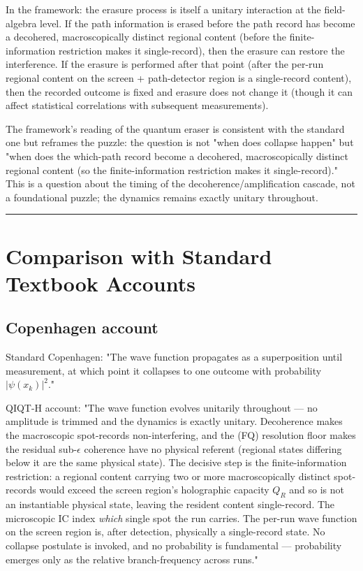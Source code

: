 \documentclass[11pt,a4paper]{article}
\begin{document}
In the framework: the erasure process is itself a unitary interaction at the field-algebra level. If the path information is erased before the path record has become a decohered, macroscopically distinct regional content (before the finite-information restriction makes it single-record), then the erasure can restore the interference. If the erasure is performed after that point (after the per-run regional content on the screen + path-detector region is a single-record content), then the recorded outcome is fixed and erasure does not change it (though it can affect statistical correlations with subsequent measurements).

The framework's reading of the quantum eraser is consistent with the standard one but reframes the puzzle: the question is not "when does collapse happen" but "when does the which-path record become a decohered, macroscopically distinct regional content (so the finite-information restriction makes it single-record)." This is a question about the timing of the decoherence/amplification cascade, not a foundational puzzle; the dynamics remains exactly unitary throughout.

\medskip\hrule\medskip

\section{Comparison with Standard Textbook Accounts}

\subsection{Copenhagen account}

Standard Copenhagen: "The wave function propagates as a superposition until measurement, at which point it collapses to one outcome with probability $|\psi(x_k)|^2$."

QIQT-H account: "The wave function evolves unitarily throughout — no amplitude is trimmed and the dynamics is exactly unitary. Decoherence makes the macroscopic spot-records non-interfering, and the (FQ) resolution floor makes the residual sub-$\epsilon$ coherence have no physical referent (regional states differing below it are the same physical state). The decisive step is the finite-information restriction: a regional content carrying two or more macroscopically distinct spot-records would exceed the screen region's holographic capacity $Q_R$ and so is not an instantiable physical state, leaving the resident content single-record. The microscopic IC index \emph{which} single spot the run carries. The per-run wave function on the screen region is, after detection, physically a single-record state. No collapse postulate is invoked, and no probability is fundamental — probability emerges only as the relative branch-frequency across runs."
\end{document}
